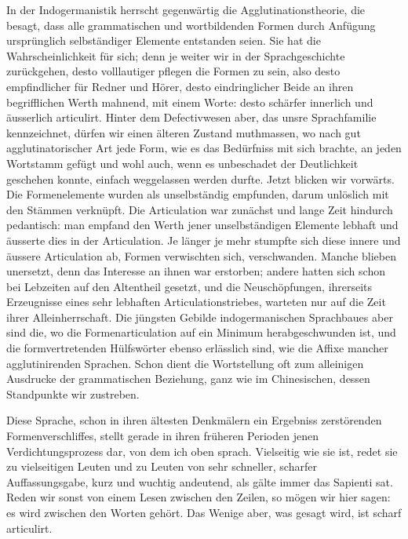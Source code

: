 In der Indogermanistik herrscht gegenwärtig die Agglutinationstheorie, die besagt, dass alle grammatischen und wortbildenden Formen durch Anfügung ursprünglich selbständiger Elemente entstanden seien. \label{fp.415} Sie hat die Wahrscheinlichkeit für sich; denn je weiter wir in der Sprachgeschichte zurückgehen, desto \label{sp.436} volllautiger pflegen die Formen zu sein, also desto empfindlicher für Redner und Hörer, desto eindringlicher Beide an ihren begrifflichen Werth mahnend, mit einem Worte: desto schärfer innerlich und äusserlich articulirt. Hinter dem Defectivwesen aber, das unsre Sprachfamilie kennzeichnet, dürfen wir einen älteren Zustand muthmassen, wo nach gut agglutinatorischer Art jede Form, wie es das Bedürfniss mit sich brachte, an jeden Wortstamm gefügt und wohl auch, wenn es unbeschadet der Deutlichkeit geschehen konnte, einfach weggelassen werden durfte. Jetzt blicken wir vorwärts. Die Formenelemente wurden als unselbständig empfunden, darum unlöslich mit den Stämmen verknüpft. Die Articulation war zunächst und lange Zeit hindurch pedantisch: man empfand den Werth jener unselbständigen Elemente lebhaft und äusserte dies in der Articulation. Je länger je mehr stumpfte sich diese innere und äussere Articulation ab, Formen verwischten sich, verschwanden. Manche blieben unersetzt, denn das Interesse an ihnen war erstorben; andere hatten sich schon bei Lebzeiten auf den Altentheil gesetzt, und die Neuschöpfungen, ihrerseits Erzeugnisse eines sehr lebhaften Articulationstriebes, warteten nur auf die Zeit ihrer Alleinherrschaft. Die jüngsten Gebilde indogermanischen Sprachbaues aber sind die, wo die Formenarticulation auf ein Minimum herabgeschwunden ist, und die formvertretenden Hülfswörter ebenso erlässlich sind, wie die Affixe mancher agglutinirenden Sprachen. Schon dient die Wortstellung oft zum alleinigen Ausdrucke der grammatischen Beziehung, ganz wie im Chinesischen, dessen Standpunkte wir zustreben.

Diese Sprache, schon in ihren ältesten Denkmälern ein Ergebniss zerstörenden Formenverschliffes, stellt gerade in ihren früheren Perioden jenen Verdichtungsprozess dar, von dem ich oben sprach. Vielseitig wie sie ist, redet sie zu vielseitigen Leuten und zu Leuten von sehr schneller, scharfer Auffassungsgabe, kurz und wuchtig andeutend, als gälte immer das Sapienti sat. Reden wir sonst von einem Lesen zwischen den Zeilen, so mögen wir hier sagen: es wird zwischen den Worten gehört. Das Wenige aber, was gesagt wird, ist scharf articulirt.

